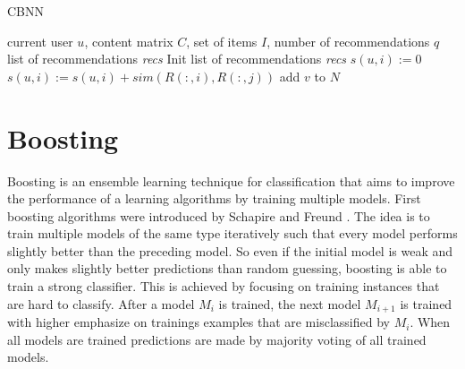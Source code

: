 \documentclass[10pt]{reportMaster}
\begin{document}
\begin{algorithm}
	\caption{CBNN}
	\label{alg:CBNN}
	\begin{algorithmic}[1]
		\Require current user $u$, content matrix $C$, set of items $I$, number of recommendations $q$
		\Ensure list of recommendations \textit{recs}
		\State Init list of recommendations \textit{recs}
			\State $s(u,i) := 0$
				\State $s(u,i) := s(u,i) + sim(R(:,i), R(:,j))$
			\EndFor
				\State add $v$ to $N$
			\EndIf
		\EndFor
	\end{algorithmic}	
\end{algorithm}

 
%
%






\section{Boosting}
\label{sec:boosting}
Boosting is an ensemble learning technique for classification that aims to improve the performance of a learning algorithms by training multiple models.
First boosting algorithms were introduced by Schapire \cite{boostingSchapire} and Freund \cite{boostingFreund}.
The idea is to train multiple models of the same type iteratively such that every model performs slightly better than the preceding model.
So even if the initial model is weak and only makes slightly better predictions than random guessing, boosting is able to train a strong classifier.
This is achieved by focusing on training instances that are hard to classify.
After a model $M_i$ is trained, the next model $M_{i+1}$ is trained with higher emphasize on trainings examples that are misclassified by $M_i$. 
When all models are trained predictions are made by majority voting of all trained models.
\end{document}
